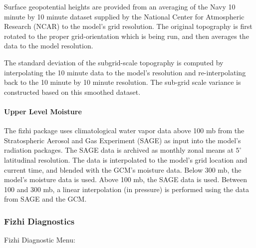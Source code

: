 Surface geopotential heights are provided from an averaging of the Navy 10 minute
by 10 minute dataset supplied by the National Center for Atmospheric Research (NCAR) to the
model's grid resolution. The original topography is first rotated to the proper grid-orientation
which is being run, and then  averages the data to the model resolution.  

The standard deviation of the subgrid-scale topography is computed by interpolating the 10 minute 
data to the model's resolution and re-interpolating back to the 10 minute by 10 minute resolution. 
The sub-grid scale variance is constructed based on this smoothed dataset.


\paragraph{Upper Level Moisture}
The fizhi package uses climatological water vapor data above 100 mb from the Stratospheric Aerosol and Gas 
Experiment (SAGE) as input into the model's radiation packages.  The SAGE data is archived
as monthly zonal means at $5^\circ$ latitudinal resolution.  The data is interpolated to the
model's grid location and current time, and blended with the GCM's moisture data.  Below 300 mb,
the model's moisture data is used.  Above 100 mb, the SAGE data is used.  Between 100 and 300 mb,
a linear interpolation (in pressure) is performed using the data from SAGE and the GCM. 


\subsubsection{Fizhi Diagnostics}

Fizhi Diagnostic Menu:
\label{sec:pkg:fizhi:diagnostics}

